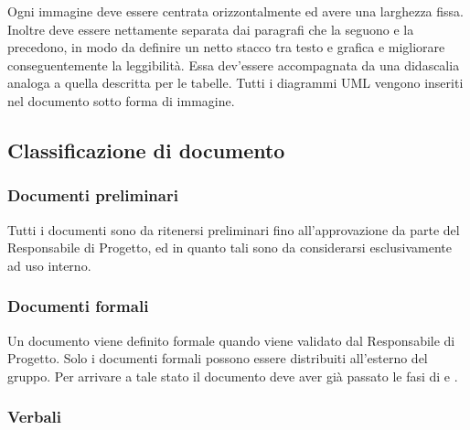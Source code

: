 	Ogni immagine deve essere centrata orizzontalmente ed avere una larghezza fissa. Inoltre deve essere nettamente separata dai paragrafi che la seguono e la precedono, in modo da definire un netto stacco tra testo e grafica e migliorare conseguentemente la leggibilità. Essa dev'essere accompagnata da una didascalia analoga a quella descritta per le tabelle. Tutti i diagrammi UML vengono inseriti nel documento sotto forma di immagine.
	
\subsection{Classificazione di documento}

	\subsubsection{Documenti preliminari}
	
	Tutti i documenti sono da ritenersi preliminari fino all'approvazione da parte del Responsabile di Progetto, ed in quanto tali sono da considerarsi esclusivamente ad uso interno.
	
	\subsubsection{Documenti formali}
	
	Un documento viene definito formale quando viene validato dal Responsabile di Progetto. Solo i documenti formali possono essere distribuiti all'esterno del gruppo. Per arrivare a tale stato il documento deve aver già passato le fasi di  e .
	
	\subsubsection{Verbali}
	
